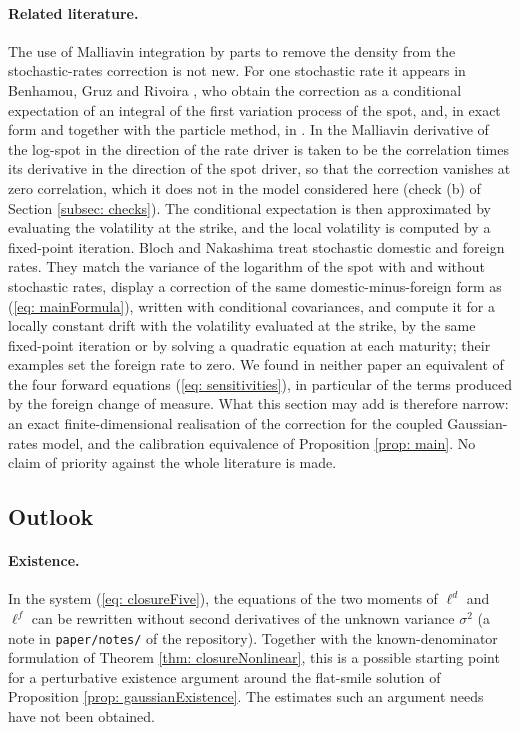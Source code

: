 \paragraph{Related literature.} The use of Malliavin integration by parts to remove the density from the stochastic-rates correction is not new. For one stochastic rate it appears in Benhamou, Gruz and Rivoira \cite{benhamouGruzRivoira}, who obtain the correction as a conditional expectation of an integral of the first variation process of the spot, and, in exact form and together with the particle method, in \cite{guyonLabordere}. In \cite{benhamouGruzRivoira} the Malliavin derivative of the log-spot in the direction of the rate driver is taken to be the correlation times its derivative in the direction of the spot driver, so that the correction vanishes at zero correlation, which it does not in the model considered here (check (b) of Section \ref{subsec: checks}). The conditional expectation is then approximated by evaluating the volatility at the strike, and the local volatility is computed by a fixed-point iteration. Bloch and Nakashima \cite{blochNakashima} treat stochastic domestic and foreign rates. They match the variance of the logarithm of the spot with and without stochastic rates, display a correction of the same domestic-minus-foreign form as (\ref{eq: mainFormula}), written with conditional covariances, and compute it for a locally constant drift with the volatility evaluated at the strike, by the same fixed-point iteration or by solving a quadratic equation at each maturity; their examples set the foreign rate to zero. We found in neither paper an equivalent of the four forward equations (\ref{eq: sensitivities}), in particular of the terms produced by the foreign change of measure. What this section may add is therefore narrow: an exact finite-dimensional realisation of the correction for the coupled Gaussian-rates model, and the calibration equivalence of Proposition \ref{prop: main}. No claim of priority against the whole literature is made.

\subsection{Outlook}
\paragraph{Existence.} In the system (\ref{eq: closureFive}), the equations of the two moments of $\ell^d$ and $\ell^f$ can be rewritten without second derivatives of the unknown variance $\sigma^2$ (a note in \texttt{paper/notes/} of the repository). Together with the known-denominator formulation of Theorem \ref{thm: closureNonlinear}, this is a possible starting point for a perturbative existence argument around the flat-smile solution of Proposition \ref{prop: gaussianExistence}. The estimates such an argument needs have not been obtained.

